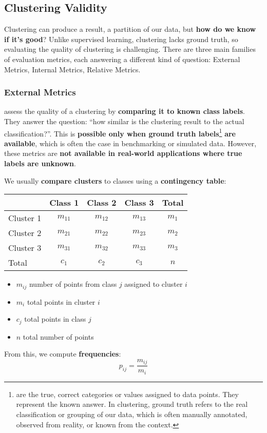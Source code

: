 \subsection{Clustering Validity}

Clustering can produce a result, a partition of our data, but \textbf{how do we know if it's good}? Unlike supervised learning, clustering lacks ground truth, so evaluating the quality of clustering is challenging. There are three main families of evaluation metrics, each answering a different kind of question: External Metrics, Internal Metrics, Relative Metrics.

\longline

\subsubsection{External Metrics}

 assess the quality of a clustering by \textbf{comparing it to known class labels}. They answer the question: ``how similar is the clustering result to the actual classification?''. This is \textbf{possible only when ground truth labels}\footnote{%
     are the true, correct categories or values assigned to data points. They represent the known answer. In clustering, ground truth refers to the real classification or grouping of our data, which is often manually annotated, observed from reality, or known from the context.
} \textbf{are available}, which is often the case in benchmarking or simulated data. However, these metrics are \textbf{not available in real-world applications where true labels are unknown}.

\highspace
We usually \textbf{compare clusters} to classes using a \textbf{contingency table}:
\begin{table}[!htp]
    \centering
    \begin{tabular}{@{} l | c | c | c | c @{}}
        \toprule
        & Class 1 & Class 2 & Class 3 & Total \\
        \midrule
        Cluster 1 & $m_{11}$ & $m_{12}$ & $m_{13}$ & $m_{1}$    \\
        Cluster 2 & $m_{21}$ & $m_{22}$ & $m_{23}$ & $m_{2}$    \\
        Cluster 3 & $m_{31}$ & $m_{32}$ & $m_{33}$ & $m_{3}$    \\
        Total     & $c_{1}$  & $c_{2}$  & $c_{3}$  & $n$        \\
        \bottomrule
    \end{tabular}
\end{table}
\begin{itemize}
    \item $m_{ij}$ number of points from class $j$ assigned to cluster $i$
    \item $m_{i}$ total points in cluster $i$
    \item $c_{j}$ total points in class $j$
    \item $n$ total number of points
\end{itemize}
From this, we compute \textbf{frequencies}:
\begin{equation}
    p_{ij} = \dfrac{m_{ij}}{m_{i}}
\end{equation}


